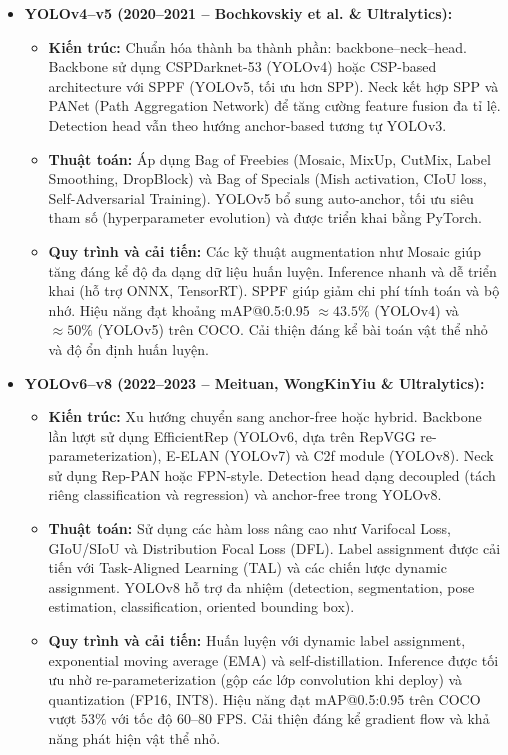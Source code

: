 \begin{itemize}
	\item \textbf{YOLOv4--v5 (2020--2021 -- Bochkovskiy et al. \& Ultralytics):}
	\begin{itemize}
		\item \textbf{Kiến trúc:} Chuẩn hóa thành ba thành phần: backbone--neck--head. Backbone sử dụng CSPDarknet-53 (YOLOv4) hoặc CSP-based architecture với SPPF (YOLOv5, tối ưu hơn SPP). Neck kết hợp SPP và PANet (Path Aggregation Network) để tăng cường feature fusion đa tỉ lệ. Detection head vẫn theo hướng anchor-based tương tự YOLOv3.
		
		\item \textbf{Thuật toán:} Áp dụng Bag of Freebies (Mosaic, MixUp, CutMix, Label Smoothing, DropBlock) và Bag of Specials (Mish activation, CIoU loss, Self-Adversarial Training). YOLOv5 bổ sung auto-anchor, tối ưu siêu tham số (hyperparameter evolution) và được triển khai bằng PyTorch.
		
		\item \textbf{Quy trình và cải tiến:} Các kỹ thuật augmentation như Mosaic giúp tăng đáng kể độ đa dạng dữ liệu huấn luyện. Inference nhanh và dễ triển khai (hỗ trợ ONNX, TensorRT). SPPF giúp giảm chi phí tính toán và bộ nhớ. Hiệu năng đạt khoảng mAP@0.5:0.95 $\approx 43.5\%$ (YOLOv4) và $\approx 50\%$ (YOLOv5) trên COCO. Cải thiện đáng kể bài toán vật thể nhỏ và độ ổn định huấn luyện.
	\end{itemize}
	
	\item \textbf{YOLOv6--v8 (2022--2023 -- Meituan, WongKinYiu \& Ultralytics):}
	\begin{itemize}
		\item \textbf{Kiến trúc:} Xu hướng chuyển sang anchor-free hoặc hybrid. Backbone lần lượt sử dụng EfficientRep (YOLOv6, dựa trên RepVGG re-parameterization), E-ELAN (YOLOv7) và C2f module (YOLOv8). Neck sử dụng Rep-PAN hoặc FPN-style. Detection head dạng decoupled (tách riêng classification và regression) và anchor-free trong YOLOv8.
		
		\item \textbf{Thuật toán:} Sử dụng các hàm loss nâng cao như Varifocal Loss, GIoU/SIoU và Distribution Focal Loss (DFL). Label assignment được cải tiến với Task-Aligned Learning (TAL) và các chiến lược dynamic assignment. YOLOv8 hỗ trợ đa nhiệm (detection, segmentation, pose estimation, classification, oriented bounding box).
		
		\item \textbf{Quy trình và cải tiến:} Huấn luyện với dynamic label assignment, exponential moving average (EMA) và self-distillation. Inference được tối ưu nhờ re-parameterization (gộp các lớp convolution khi deploy) và quantization (FP16, INT8). Hiệu năng đạt mAP@0.5:0.95 trên COCO vượt $53\%$ với tốc độ 60--80 FPS. Cải thiện đáng kể gradient flow và khả năng phát hiện vật thể nhỏ.
	\end{itemize}
	

\end{itemize}

